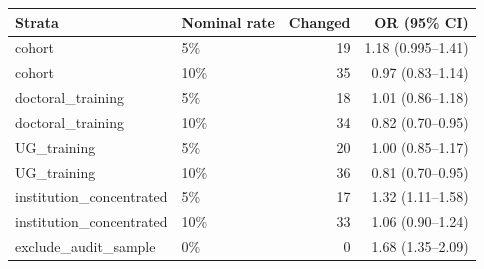 \begin{tabular}{llrr}
\toprule
Strata & Nominal rate & Changed & OR (95\% CI) \\
\midrule
cohort & 5\% & 19 & 1.18 (0.995--1.41) \\
cohort & 10\% & 35 & 0.97 (0.83--1.14) \\
doctoral\_training & 5\% & 18 & 1.01 (0.86--1.18) \\
doctoral\_training & 10\% & 34 & 0.82 (0.70--0.95) \\
UG\_training & 5\% & 20 & 1.00 (0.85--1.17) \\
UG\_training & 10\% & 36 & 0.81 (0.70--0.95) \\
institution\_concentrated & 5\% & 17 & 1.32 (1.11--1.58) \\
institution\_concentrated & 10\% & 33 & 1.06 (0.90--1.24) \\
exclude\_audit\_sample & 0\% & 0 & 1.68 (1.35--2.09) \\
\bottomrule
\end{tabular}
